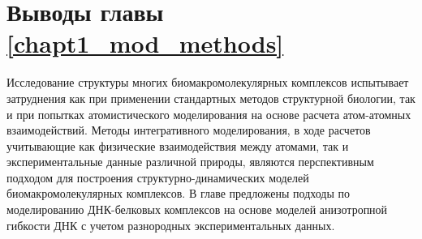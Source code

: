 \section{Выводы главы \ref{chapt1_mod_methods}}
Исследование структуры многих биомакромолекулярных комплексов испытывает затруднения как при применении стандартных методов структурной биологии, так и при попытках атомистического моделирования на основе расчета атом-атомных взаимодействий. Методы интегративного моделирования, в ходе расчетов учитывающие как физические взаимодействия между атомами, так и экспериментальные данные различной природы, являются перспективным подходом для построения структурно-динамических моделей биомакромолекулярных комплексов. В главе предложены подходы по моделированию ДНК-белковых комплексов на основе моделей анизотропной гибкости ДНК с учетом разнородных экспериментальных данных.
 
